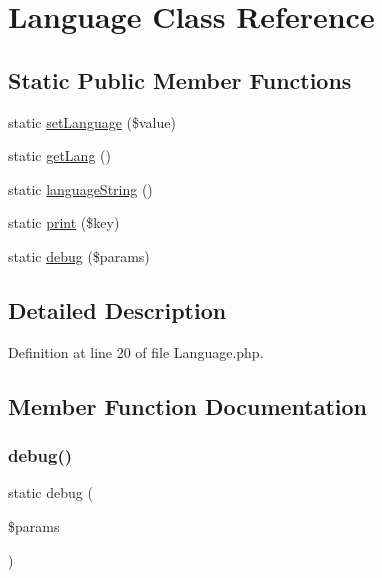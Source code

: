 \hypertarget{class_zest_1_1_language_1_1_language}{}\section{Language Class Reference}
\label{class_zest_1_1_language_1_1_language}
\subsection*{Static Public Member Functions}
\begin{DoxyCompactItemize}
\item 
static \mbox{\hyperlink{class_zest_1_1_language_1_1_language_ac8a46cd0f5e5c850c5ea9b79d481de1f}{set\+Language}} (\$value)
\item 
static \mbox{\hyperlink{class_zest_1_1_language_1_1_language_a077fea27c088bf2ea25704aab2f715dd}{get\+Lang}} ()
\item 
static \mbox{\hyperlink{class_zest_1_1_language_1_1_language_ae6e8660c2e4445fe371b17c64915ef7a}{language\+String}} ()
\item 
static \mbox{\hyperlink{class_zest_1_1_language_1_1_language_aa22b5167814cd0d76f9c98d06da7cc2e}{print}} (\$key)
\item 
static \mbox{\hyperlink{class_zest_1_1_language_1_1_language_a39f92ff73a1a732560a5efcdaa755f0c}{debug}} (\$params)
\end{DoxyCompactItemize}


\subsection{Detailed Description}


Definition at line 20 of file Language.\+php.



\subsection{Member Function Documentation}
\mbox{\label{class_zest_1_1_language_1_1_language_a39f92ff73a1a732560a5efcdaa755f0c}} 
\subsubsection{\texorpdfstring{debug()}{debug()}}
{\footnotesize\ttfamily static debug (\begin{DoxyParamCaption}\item[{}]{\$params }\end{DoxyParamCaption})\hspace{0.3cm}{\ttfamily [static]}}

